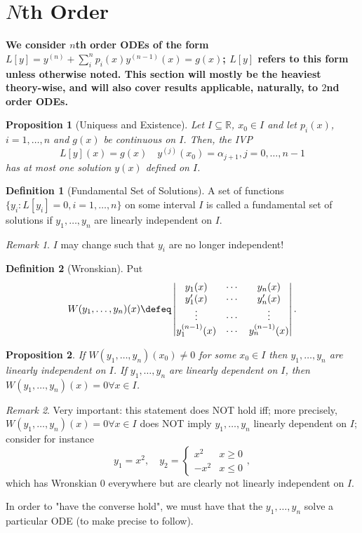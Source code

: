 \documentclass[12pt, oneside]{article}
\theoremstyle{definition}
\newtheorem{defn}{Definition}
\theoremstyle{plain}
\newtheorem{prop}{Proposition}
\theoremstyle{remark}
\newtheorem{remark}{Remark}
\let\origsection=\section
\renewcommand\section[1]{\origsection{#1}\label{sec:\thesection}}
\begin{document}
\section{\texorpdfstring{$N$}{N}th Order}

\textbf{We consider $n$th order ODEs of the form $L[y]=y^{(n)} + \sum_{i}^n p_i(x) y^{(n-1)}(x) = g(x)$; $L[y]$ refers to this form unless otherwise noted. This section will mostly be the heaviest theory-wise, and will also cover results applicable, naturally, to $2$nd order ODEs.}

\begin{prop}[Uniquess and Existence]
  Let $I \subseteq \mathbb{R}$, $x_0 \in I$ and let $p_i(x)$, $i = 1, \dots, n$ and $g(x)$ be continuous on $I$. Then, the IVP\[
    L[y](x) = g(x) \quad y^{(j)}(x_0) = \alpha_{j+1}, j = 0, \dots, n - 1
    \]
    has at most one solution $y(x)$ defined on $I$.
\end{prop}

\begin{defn}[Fundamental Set of Solutions]
  A set of functions $\{y_i : L[y_i] = 0, i = 1, \dots, n\}$ on some interval $I$ is called a fundamental set of solutions if $y_1, \dots, y_n$ are linearly independent on $I$.
\end{defn}

\begin{remark}
  $I$ may change such that $y_i$ are no longer independent!
\end{remark}

\begin{defn}[Wronskian]
  Put \[
  W(y_1, \dots, y_n )(x) \defeq \left|\begin{matrix}
    y_1(x) & \cdots & y_n(x)\\
    y_1'(x) & \cdots & y_n'(x)\\
    \vdots & \cdots & \vdots \\
    y_1^{(n-1)}(x) & \cdots & y_n^{(n-1)}(x)
\end{matrix}\right|.    
  \]
\end{defn}

\begin{prop}
  If $W(y_1, \dots, y_n)(x_0) \neq 0$ for some $x_0 \in I$ then $y_1, \dots, y_n$ are linearly independent on $I$. If $y_1, \dots, y_n$ are linearly dependent on $I$, then $W(y_1, \dots, y_n)(x) = 0 \forall x \in I$.
\end{prop}

\begin{remark}
  Very important: this statement does NOT hold iff; more precisely, $W(y_1, \dots, y_n)(x) = 0 \forall x \in I$ does NOT imply $y_1, \dots, y_n$ linearly dependent on $I$; consider for instance \[
    y_1 = x^2, \quad y_2 = \begin{cases}
      x^2 & x \geq 0\\
      -x^2 & x \leq 0
    \end{cases},  
    \]
    which has Wronskian $0$ everywhere but are clearly not linearly independent on $I$.

    In order to "have the converse hold", we must have that the $y_1, \dots, y_n$ solve a particular ODE (to make precise to follow).
\end{remark}
\end{document}
